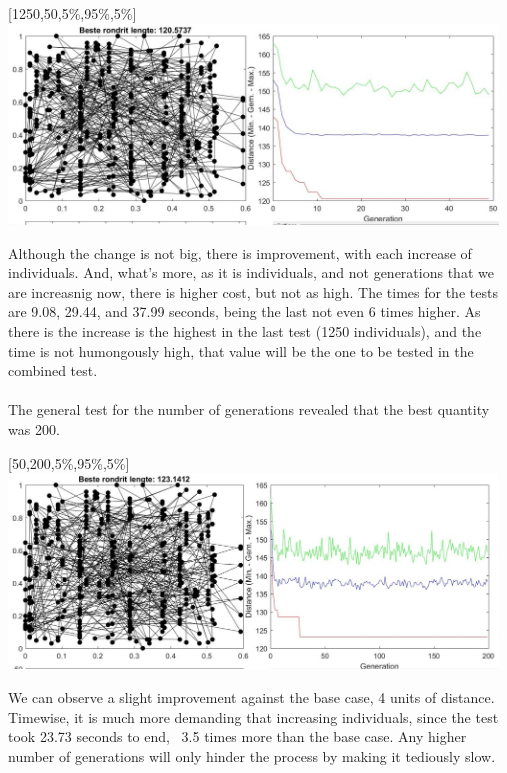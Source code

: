\begin{center}
[1250,50,5\%,95\%,5\%]\\
\includegraphics[width=13cm]{img/specific/order_crossover/general_4.jpg}
\end{center}

Although the change is not big, there is improvement, with each increase
of individuals. And, what's more, as it is individuals, and not
generations that we are increasnig now, there is higher cost, but not as high.
The times for the tests are 9.08, 29.44, and 37.99 seconds, being the last not
even 6 times higher. As there is the increase is the highest in the last
test (1250 individuals), and the time is not humongously high, that value
will be the one to be tested in the combined test.\\ 
\\
The general test for the number of generations revealed that the best quantity
was 200.\\
\begin{center}
[50,200,5\%,95\%,5\%]\\
\includegraphics[width=13cm]{img/specific/order_crossover/general_5.jpg}
\end{center}

We can observe a slight improvement against the base case, 4 units of
distance. Timewise, it is much more demanding that increasing
individuals, since the test took 23.73 seconds to end, ~3.5 times more than the
base case. Any higher number of generations will only hinder the process
by making it tediously slow.\\

